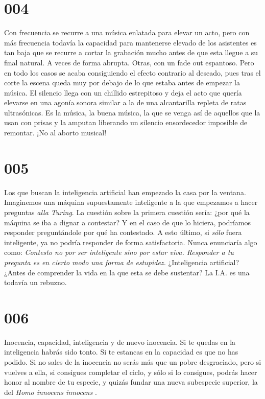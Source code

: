 \documentclass[a4paper,11pt,openright,twocolumn]{book}
\begin{document}
\section*{004}

Con frecuencia se recurre a una música enlatada para elevar un acto, pero con más frecuencia todavía la capacidad para
 mantenerse elevado de los asistentes es tan baja que se recurre a cortar la grabación mucho antes de que esta llegue a su final natural. A veces de forma abrupta. Otras, con un fade out espantoso. Pero en todo los casos se acaba consiguiendo el efecto contrario al deseado, pues tras el corte la escena queda muy por debajo de lo que estaba antes de empezar la música. El silencio llega con un chillido estrepitoso y deja el acto que quería elevarse en una agonía sonora similar a la de una alcantarilla repleta de ratas ultrasónicas. Es la música, la buena música, la que se venga así de aquellos que la usan con prisas y la amputan liberando un silencio ensordecedor imposible de remontar. ¡No al aborto musical!

\section*{005}
Los que buscan la inteligencia artificial han empezado la casa por la ventana. Imaginemos una máquina supuestamente inteligente a la que empezamos a hacer preguntas {\it alla Turing}. La cuestión sobre la primera cuestión sería: ¿por qué la máquina se iba a dignar a contestar? Y en el caso de que lo hiciera, podríamos responder preguntándole por qué ha contestado. A esto último, si {\it sólo}   fuera inteligente, ya no podría responder de forma satisfactoria. Nunca enunciaría algo como: {\it  Contesto
no por ser inteligente sino por estar viva. Responder a tu pregunta es en cierto modo una forma de estupidez.}   ¿Inteligencia artificial? ¿Antes de comprender la vida en la que esta se debe sustentar? La I.A. es una todavía un rebuzno.


\section*{006}

Inocencia, capacidad, inteligencia y de nuevo inocencia. Si te quedas en la inteligencia habrás sido tonto. Si te estancas en la capacidad es que no has podido. Si no sales de la inocencia no serás más que un pobre desgraciado, pero si vuelves a ella, si consigues completar el ciclo, y sólo si lo consigues, podrás hacer honor al nombre de tu especie, y quizás fundar una nueva subespecie superior, la del {\it  Homo innocens innocens}  .
\end{document}
